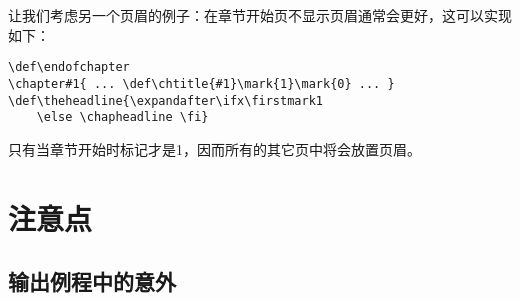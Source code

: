 \documentclass{book}
\begin{document}

让我们考虑另一个页眉的例子：在章节开始页不显示页眉通常会更好，这可以实现如下：

\begin{verbatim}
\def\endofchapter
\chapter#1{ ... \def\chtitle{#1}\mark{1}\mark{0} ... }
\def\theheadline{\expandafter\ifx\firstmark1
    \else \chapheadline \fi}
\end{verbatim}
只有当章节开始时标记才是1，因而所有的其它页中将会放置页眉。


\section{注意点}

\subsection{输出例程中的意外}

\end{document}
